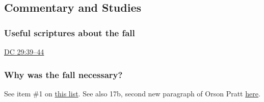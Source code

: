 	
\subsection{Commentary and Studies} %
	\label{FALL-COMMENTARY}

	
		
	\subsubsection{Useful scriptures about the fall}
	
		\begin{compactitem}
			\item \hyperref[DC29-39]{DC 29:39--44}
		\end{compactitem}
		
	\subsubsection{Why was the fall necessary?}
		\label{FALL-necessity}
		
		See item \#1 on \hyperref[ADAMGOD-thoughts]{this list}. See also 17b, second new paragraph of Orson Pratt \hyperref[EMS-1852-OP-28-AUG-1852]{here}.